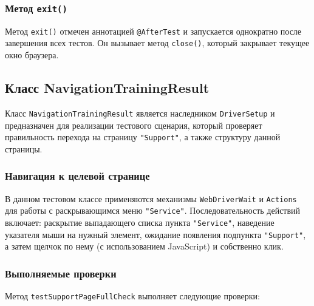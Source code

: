 \documentclass{article}[14pt]
\begin{document}
\subsubsection*{Метод \texttt{exit()}}
Метод \texttt{exit()} отмечен аннотацией \texttt{@AfterTest} и запускается однократно после завершения всех тестов. Он вызывает метод \texttt{close()}, который закрывает текущее окно браузера.

\subsection{Класс NavigationTrainingResult}

Класс \texttt{NavigationTrainingResult} является наследником \texttt{DriverSetup} и предназначен для реализации тестового сценария, который проверяет правильность перехода на страницу \texttt{"Support"}, а также структуру данной страницы.

\subsubsection{Навигация к целевой странице}

В данном тестовом классе применяются механизмы \texttt{WebDriverWait} и \texttt{Actions} для работы с раскрывающимся меню 
\texttt{"Service"}. Последовательность действий включает: раскрытие выпадающего списка пункта \texttt{"Service"}, наведение указателя 
мыши на нужный элемент, ожидание появления подпункта \texttt{"Support"}, а затем щелчок по нему (с использованием JavaScript) и собственно клик.

\subsubsection{Выполняемые проверки}

Метод \texttt{testSupportPageFullCheck} выполняет следующие проверки:
\end{document}

